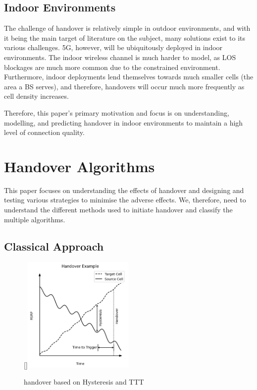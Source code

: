 \subsection{Indoor Environments}
The challenge of handover is relatively simple in outdoor environments, and with it being the main target of literature on the subject, many solutions exist to its various challenges. 5G, however, will be ubiquitously deployed in indoor environments. The indoor wireless channel is much harder to model, as LOS blockages are much more common due to the constrained environment. Furthermore, indoor deployments lend themselves towards much smaller cells (the area a BS serves), and therefore, handovers will occur much more frequently as cell density increases.

Therefore, this paper's primary motivation and focus is on understanding, modelling, and predicting handover in indoor environments to maintain a high level of connection quality.

\section{Handover Algorithms}
\label{sec:algorithms}
This paper focuses on understanding the effects of handover and designing and testing various strategies to minimise the adverse effects. We, therefore, need to understand the different methods used to initiate handover and classify the multiple algorithms.

\subsection{Classical Approach}

\begin{figure}
     \raisebox{0pt}[\dimexpr{}\baselineskip\relax]{\includegraphics[width=0.48\textwidth]{src/img/hysteresis_ttt.png}}
    \caption{handover based on Hysteresis and TTT}
    \label{fig:hysteresis_handover}
\end{figure}

